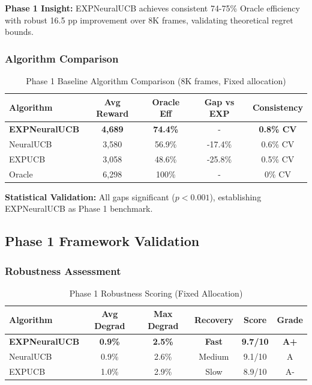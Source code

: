 \documentclass[11pt,a4paper]{article}
\newcommand{\performance}[1]{\textcolor{performancecolor}{\textbf{#1}}}
\newcommand{\success}[1]{\textcolor{successcolor}{\textbf{#1}}}
\begin{document}
\textbf{Phase 1 Insight:} EXPNeuralUCB achieves consistent 74-75\% Oracle efficiency with robust 16.5 pp improvement over 8K frames, validating theoretical regret bounds.

\subsubsection{Algorithm Comparison}

\begin{table}[h]
\centering\small
\caption{Phase 1 Baseline Algorithm Comparison (8K frames, Fixed allocation)}
\begin{tabular}{lcccc}
\toprule
\textbf{Algorithm} & \textbf{Avg Reward} & \textbf{Oracle Eff} & \textbf{Gap vs EXP} & \textbf{Consistency} \\
\midrule
\performance{EXPNeuralUCB} & \performance{4,689} & \performance{74.4\%} & - & \success{0.8\% CV} \\
NeuralUCB & 3,580 & 56.9\% & -17.4\% & 0.6\% CV \\
EXPUCB & 3,058 & 48.6\% & -25.8\% & 0.5\% CV \\
\midrule
Oracle & 6,298 & 100\% & - & 0\% CV \\
\bottomrule
\end{tabular}
\end{table}

\textbf{Statistical Validation:} All gaps significant ($p < 0.001$), establishing EXPNeuralUCB as Phase 1 benchmark.

\subsection{Phase 1 Framework Validation}

\subsubsection{Robustness Assessment}

\begin{table}[h]
\footnotesize\centering
\caption{Phase 1 Robustness Scoring (Fixed Allocation)}
\begin{tabular}{lccccc}
\toprule
\textbf{Algorithm} & \textbf{Avg Degrad} & \textbf{Max Degrad} & \textbf{Recovery} & \textbf{Score} & \textbf{Grade} \\
\midrule
\success{EXPNeuralUCB} & \success{0.9\%} & \success{2.5\%} & \success{Fast} & \success{9.7/10} & \success{A+} \\
NeuralUCB & 0.9\% & 2.6\% & Medium & 9.1/10 & A \\
EXPUCB & 1.0\% & 2.9\% & Slow & 8.9/10 & A- \\
\bottomrule
\end{tabular}
\end{table}
\end{document}
